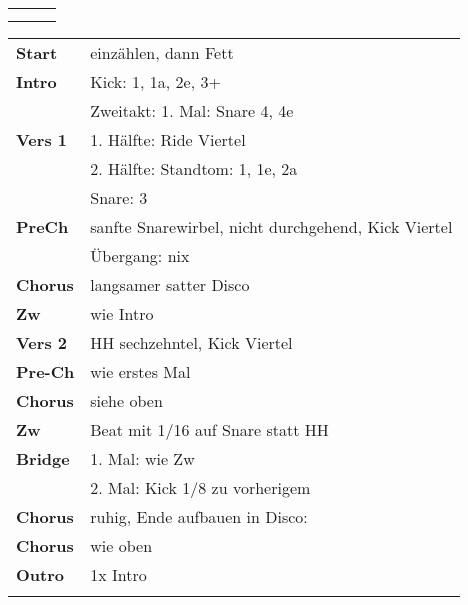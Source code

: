 

\begin{tabular}{p{0.6cm}p{12cm}p{1.4cm}}
	\rowcolor{cyan} \myRow{\thesongnumber} & \myRow{One Name} & \myRow{82} \\
	                                       &                  &            \\
\end{tabular}

\begin{tabular}{p{1.6cm}l}
	\textbf{Start}  & einzählen, dann Fett                                \\
	\textbf{Intro}  & Kick: 1, 1a, 2e, 3+                                 \\
	                & Zweitakt: 1. Mal: Snare 4, 4e                       \\
	\textbf{Vers 1} & 1. Hälfte: Ride Viertel                             \\
	                & 2. Hälfte: Standtom: 1, 1e, 2a                      \\
	                & Snare: 3                                            \\
	\textbf{PreCh}  & sanfte Snarewirbel, nicht durchgehend, Kick Viertel \\
	                & Übergang: nix                                       \\
	\textbf{Chorus} & langsamer satter Disco                              \\
	\textbf{Zw}     & wie Intro                                           \\
	\textbf{Vers 2} & HH sechzehntel, Kick Viertel                        \\
	\textbf{Pre-Ch} & wie erstes Mal                                      \\
	\textbf{Chorus} & siehe oben                                          \\
	\textbf{Zw}     & Beat mit 1/16 auf Snare statt HH                    \\
	\textbf{Bridge} & 1. Mal: wie Zw                                      \\
	                & 2. Mal: Kick 1/8 zu vorherigem                      \\
	\textbf{Chorus} & ruhig, Ende aufbauen in Disco:                      \\
	\textbf{Chorus} & wie oben                                            \\
	\textbf{Outro}  & 1x Intro                                            \\
	                &                                                     \\
\end{tabular}
